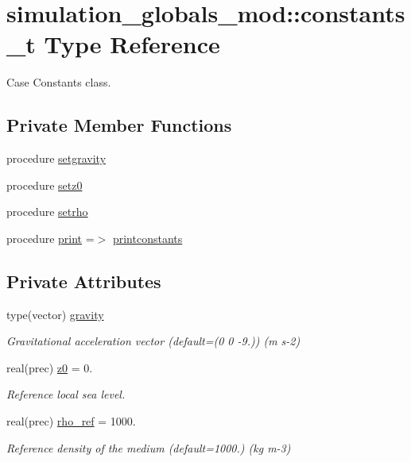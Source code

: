 \hypertarget{structsimulation__globals__mod_1_1constants__t}{}\section{simulation\+\_\+globals\+\_\+mod\+:\+:constants\+\_\+t Type Reference}
\label{structsimulation__globals__mod_1_1constants__t}


Case Constants class.  


\subsection*{Private Member Functions}
\begin{DoxyCompactItemize}
\item 
procedure \hyperlink{structsimulation__globals__mod_1_1constants__t_af7a73fd39f95eb68c5d070c08d14bb4d}{setgravity}
\item 
procedure \hyperlink{structsimulation__globals__mod_1_1constants__t_a0ad20f9a9b8c4fd0a6813415e690353a}{setz0}
\item 
procedure \hyperlink{structsimulation__globals__mod_1_1constants__t_a184df716402820585a1edbf2933215ec}{setrho}
\item 
procedure \hyperlink{structsimulation__globals__mod_1_1constants__t_a920570af3904fb782a96d3765e314468}{print} =$>$ \hyperlink{namespacesimulation__globals__mod_a20ba28d72a9bea823d9373a94f97026e}{printconstants}
\end{DoxyCompactItemize}
\subsection*{Private Attributes}
\begin{DoxyCompactItemize}
\item 
type(vector) \hyperlink{structsimulation__globals__mod_1_1constants__t_ab1d29ee73044e2bb7b47ca302e2cfdf9}{gravity}
\begin{DoxyCompactList}\small\item\em Gravitational acceleration vector (default=(0 0 -\/9.)) (m s-\/2) \end{DoxyCompactList}\item 
real(prec) \hyperlink{structsimulation__globals__mod_1_1constants__t_a737e824cf720aea683fe23939d12aa5b}{z0} = 0.
\begin{DoxyCompactList}\small\item\em Reference local sea level. \end{DoxyCompactList}\item 
real(prec) \hyperlink{structsimulation__globals__mod_1_1constants__t_a7e4a2bb5206340621bfce6792b527f6d}{rho\+\_\+ref} = 1000.
\begin{DoxyCompactList}\small\item\em Reference density of the medium (default=1000.) (kg m-\/3) \end{DoxyCompactList}\end{DoxyCompactItemize}


